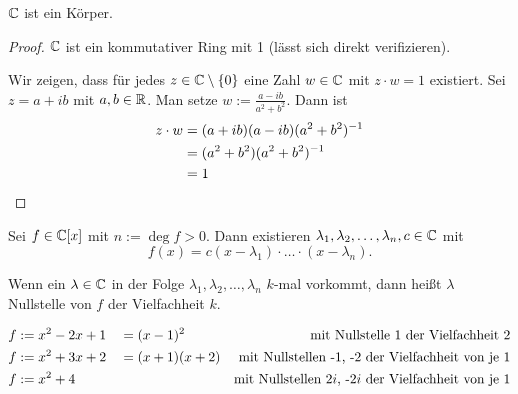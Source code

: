 \begin{propn}
	$ \mathbb C $ ist ein Körper.
\end{propn}
\begin{proof}
	$ \mathbb C $ ist ein kommutativer Ring mit 1 (lässt sich direkt verifizieren).

	Wir zeigen, dass für jedes $ z \in \mathbb C\setminus\{0\} $ eine Zahl $ w \in \mathbb C $ mit $ z \cdot w = 1 $ existiert. Sei $ z = a+ib $ mit $ a,b \in \mathbb R $. Man setze $ w := \frac{a-ib}{a^2+b^2} $. Dann ist
	\begin{align*}
		z \cdot w &= (a+ib)(a-ib)(a^2+b^2)^{-1} \\
			&= (a^2 + b^2)(a^2+b^2)^{-1} \\
			&= 1 \qedhere
	\end{align*}
\end{proof}
 

\begin{thm}
	Sei $ f \in \mathbb C[x] $ mit $ n := \deg f > 0 $. Dann existieren $ \lambda_1, \lambda_2, \ldots, \lambda_n, c \in \mathbb C $ mit
	\begin{equation}
		f(x) = c(x-\lambda_1) \cdot \ldots \cdot (x - \lambda_n).
	\end{equation}
\end{thm}

\begin{bem}
	Wenn ein $ \lambda \in \mathbb C $ in der Folge $ \lambda_1, \lambda_2, \ldots, \lambda_n $ $ k $-mal vorkommt, dann heißt $ \lambda $ Nullstelle von $ f $ der Vielfachheit $ k $.
\end{bem}

\begin{bsp}
\begin{align*}
	f &:= x^2 -2x +1 &&= (x-1)^2 & \text{mit Nullstelle 1 der Vielfachheit 2} \\
	f &:= x^2 +3x +2 &&= (x+1)(x+2) & \text{mit Nullstellen -1, -2 der Vielfachheit von je 1} \\
	f &:= x^2 +4 && & \text{mit Nullstellen 2$ i $, -2$ i $ der Vielfachheit von je 1}
\end{align*}
\end{bsp}
